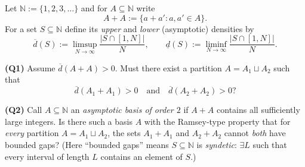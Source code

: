 Let $\mathbb{N}:=\{1,2,3,\dots\}$ and for $A\subseteq \mathbb{N}$ write
\[
A+A := \{a+a': a,a'\in A\}.
\]
For a set $S\subseteq \mathbb{N}$ define its \emph{upper} and \emph{lower} (asymptotic) densities by
\[
\overline d(S):=\limsup_{N\to\infty}\frac{|S\cap [1,N]|}{N},
\qquad
\underline d(S):=\liminf_{N\to\infty}\frac{|S\cap [1,N]|}{N}.
\]

\medskip
\noindent\textbf{(Q1)} Assume $\overline d(A+A)>0$. Must there exist a partition $A=A_1\sqcup A_2$
such that
\[
\overline d(A_1+A_1)>0
\quad\text{and}\quad
\overline d(A_2+A_2)>0?
\]

\medskip
\noindent\textbf{(Q2)} Call $A\subseteq \mathbb{N}$ an \emph{asymptotic basis of order $2$} if $A+A$ contains all sufficiently large integers.
Is there such a basis $A$ with the Ramsey-type property that for \emph{every} partition
$A=A_1\sqcup A_2$, the sets $A_1+A_1$ and $A_2+A_2$ cannot \emph{both} have bounded gaps?
(Here ``bounded gaps'' means $S\subseteq \mathbb{N}$ is \emph{syndetic}: $\exists L$ such that every interval of length $L$
contains an element of $S$.)
